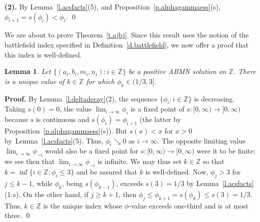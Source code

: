 \documentclass[letterpaper,11pt,oneside,reqno]{amsbook}
\newcommand{\Z}{\ensuremath{\mathbb{Z}}}
\numberwithin{figure}{chapter}
\newtheorem{lemma}[theorem]{Lemma}
\theoremstyle{definition}
\theoremstyle{definition}
\theoremstyle{definition}
\theoremstyle{definition}
\theoremstyle{definition}
\newcommand{\macphi}{\phi}
\newcommand{\abmnmacspace}{\textrm{ABMN} }
\begin{document}
{\bf (2).} By Lemma~\ref{l.acsfacts}(5), and 
 Proposition~\ref{p.alphagammaess}(s), 
$\macphi_{i+1} = s(\macphi_i) < \macphi_i$. \qed

We are about to prove Theorem~\ref{t.ajbj}.
Since this result uses the notion of the battlefield index specified in Definition~\ref{d.battlefield}, we now offer a proof that this index is well-defined.
\begin{lemma}\label{l.battlefield}
Let $\big\{ (a_i,b_i,m_i,n_i): i \in \Z \big\}$ be a positive \abmnmacspace solution on $\Z$.
There is a unique value of $k \in \Z$ for which $\macphi_k \in (1/3,3]$.
\end{lemma}
{\bf Proof.}
By Lemma~\ref{l.deltadecay}(2), the sequence $\big\{ \macphi_i: i \in \Z \big\}$ is decreasing. Taking $s(0) = 0$, the value $\lim_{i \to \infty}\macphi_i$
is a fixed point of $s:[0,\infty) \to [0,\infty)$ because $s$ is continuous and $s(\macphi_i) = \macphi_{i+1}$ (the latter by Proposition~\ref{p.alphagammaess}(s)).
But $s(x) < x$ for $x > 0$ by~Lemma~\ref{l.acsfacts}(5). 
Thus, $\macphi_i \searrow 0 $ as $i \to \infty$. The opposite limiting value $\lim_{i \to \infty} \macphi_{-i}$ would also be a fixed point for  $s:[0,\infty) \to [0,\infty)$ 
were it to be finite; we see then that $\lim_{i \to \infty} \macphi_{-i}$ is infinite. 
We may thus set $k \in \Z$ so that $k = \inf \big\{ i \in \Z: \macphi_i \leq 3 \big\}$ and be assured that $k$ is well-defined.
Now, $\macphi_j > 3$ for $j \leq k-1$, while $\macphi_k$, being $s(\macphi_{k-1})$, exceeds $s(3) = 1/3$
by Lemma~\ref{l.acsfacts}(1:$s$).
On the other hand, if $j \geq k+1$, then $\macphi_j \leq \macphi_{k+1} = s(\macphi_k) \leq s(3) = 1/3$. Thus, $k \in \Z$ is the unique index whose $\macphi$-value exceeds one-third and is at most three. \qed 
\end{document}
